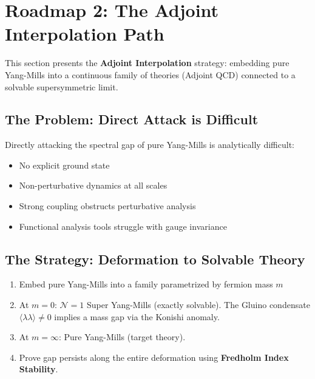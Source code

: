 \section{Roadmap 2: The Adjoint Interpolation Path}
\label{sec:roadmap-adjoint-interpolation}
\label{subsec:adjoint-interpolation}

This section presents the \textbf{Adjoint Interpolation} strategy: embedding 
pure Yang-Mills into a continuous family of theories (Adjoint QCD) connected 
to a solvable supersymmetric limit.

\subsection{The Problem: Direct Attack is Difficult}

\begin{problem}
Directly attacking the spectral gap of pure Yang-Mills is analytically difficult:
\begin{itemize}
\item No explicit ground state
\item Non-perturbative dynamics at all scales
\item Strong coupling obstructs perturbative analysis
\item Functional analysis tools struggle with gauge invariance
\end{itemize}
\end{problem}

\subsection{The Strategy: Deformation to Solvable Theory}

\begin{strategy}
\begin{enumerate}
\item Embed pure Yang-Mills into a family parametrized by fermion mass $m$
\item At $m = 0$: $\mathcal{N}=1$ Super Yang-Mills (exactly solvable). The Gluino condensate $\langle \lambda \lambda \rangle \neq 0$ implies a mass gap via the Konishi anomaly.
\item At $m = \infty$: Pure Yang-Mills (target theory).
\item Prove gap persists along the entire deformation using \textbf{Fredholm Index Stability}.
\end{enumerate}
\end{strategy}

